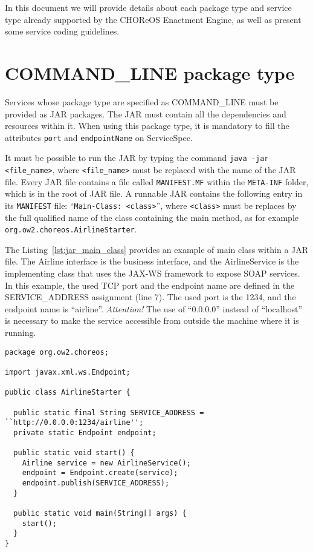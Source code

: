 \documentclass[a4paper, 10pt]{article}
\newcommand{\ee}{CHOReOS Enactment Engine}
\begin{document}
In this document we will provide details about each package type and service type already supported by the \ee, as well as present some service coding guidelines. 

\section{COMMAND\_LINE package type}

Services whose package type are specified as COMMAND\_LINE must be provided as JAR packages. The JAR must contain all the dependencies and resources within it. When using this package type, it is mandatory to fill the attributes \texttt{port} and \texttt{endpointName} on \textsf{ServiceSpec}.

It must be possible to run the JAR by typing the command \texttt{java -jar <file\_name>}, where \texttt{<file\_name>} must be replaced with the name of the JAR file. Every JAR file contains a file called \texttt{MANIFEST.MF} within the \texttt{META-INF} folder, which is in the root of JAR file. A runnable JAR contains the following entry in its \texttt{MANIFEST} file: ``\texttt{Main-Class: <class>}'', where \texttt{<class>} must be replaces by the full qualified name of the class containing the main method, as for example \texttt{org.ow2.choreos.AirlineStarter}.

The Listing~\ref{lst:jar_main_class} provides an example of main class within a JAR file. The \textsf{Airline} interface is the business interface, and the \textsf{AirlineService} is the implementing class that uses the JAX-WS framework to expose SOAP services. In this example, the used TCP port and the endpoint name are defined in the SERVICE\_ADDRESS assignment (line 7). The used port is the 1234, and the endpoint name is ``airline''. \emph{Attention!} The use of ``0.0.0.0'' instead of ``localhost'' is necessary to make the service accessible from outside the machine where it is running. 


\lstset{
language=Java,
numbers=left
}

{\footnotesize
\begin{lstlisting}[caption=Example of a class with the main method within a JAR file, label=lst:jar_main_class]
package org.ow2.choreos;

import javax.xml.ws.Endpoint;

public class AirlineStarter {

  public static final String SERVICE_ADDRESS = ``http://0.0.0.0:1234/airline'';
  private static Endpoint endpoint;
	
  public static void start() {
    Airline service = new AirlineService();
    endpoint = Endpoint.create(service);
    endpoint.publish(SERVICE_ADDRESS);
  }

  public static void main(String[] args) {	
    start();
  }
}
\end{lstlisting}
}
\end{document}
